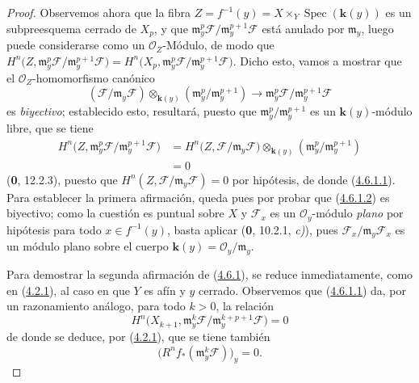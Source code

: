 \begin{proof}
Observemos ahora que la fibra
$Z=f^{-1}(y)=X\times_Y\operatorname{Spec}(\boldsymbol{k}(y))$ es un subpreesquema cerrado
de $X_p$, y que
$\mathfrak m_y^p\mathcal F/\mathfrak m_y^{p+1}\mathcal F$ está anulado por
$\mathfrak m_y$, luego puede considerarse como un $\mathcal O_Z$-Módulo, de
modo que
$H^n\bigl(Z,\mathfrak m_y^p\mathcal F/
\mathfrak m_y^{p+1}\mathcal F\bigr)
=H^n\bigl(X_p,\mathfrak m_y^p\mathcal F/
\mathfrak m_y^{p+1}\mathcal F\bigr)$.
Dicho esto, vamos a mostrar que el $\mathcal O_Z$-homomorfismo canónico
\[
\label{III.4.6.1.2-fr}
(\mathcal F/\mathfrak m_y\mathcal F)
\otimes_{\mathbf{k}(y)}(\mathfrak m_y^p/\mathfrak m_y^{p+1})
\longrightarrow
\mathfrak m_y^p\mathcal F/\mathfrak m_y^{p+1}\mathcal F
\tag{4.6.1.2}
\]
es \emph{biyectivo}; establecido esto, resultará, puesto que
$\mathfrak m_y^p/\mathfrak m_y^{p+1}$ es un $\boldsymbol{k}(y)$-módulo libre, que se tiene
\[
\begin{split}
H^n\bigl(Z,\mathfrak m_y^p\mathcal F/
\mathfrak m_y^{p+1}\mathcal F\bigr)
&=H^n\bigl(Z,\mathcal F/\mathfrak m_y\mathcal F\bigr)
\otimes_{\mathbf{k}(y)}(\mathfrak m_y^p/\mathfrak m_y^{p+1})\\
&=0
\end{split}
\]
(\textbf{0}, 12.2.3), puesto que
$H^n(Z,\mathcal F/\mathfrak m_y\mathcal F)=0$ por hipótesis, de donde
(\hyperref[III.4.6.1.1-fr]{4.6.1.1}). Para establecer la primera afirmación,
queda pues por probar que (\hyperref[III.4.6.1.2-fr]{4.6.1.2}) es biyectivo;
como la cuestión es puntual sobre $X$ y $\mathcal F_x$ es un
$\mathcal O_y$-módulo \emph{plano} por hipótesis para todo $x\in f^{-1}(y)$,
basta aplicar (\textbf{0}, 10.2.1, \emph{c)}), pues
$\mathcal F_x/\mathfrak m_y\mathcal F_x$ es un módulo plano sobre el cuerpo
$\boldsymbol{k}(y)=\mathcal O_y/\mathfrak m_y$.

Para demostrar la segunda afirmación de (\hyperref[III.4.6.1-fr]{4.6.1}), se
reduce inmediatamente, como en (\hyperref[III.4.2.1-fr]{4.2.1}), al caso en que
$Y$ es afín y $y$ cerrado. Observemos que
(\hyperref[III.4.6.1.1-fr]{4.6.1.1}) da, por un razonamiento análogo,
para todo $k>0$, la relación
\[
\label{III.4.6.1.3-fr}
H^n\bigl(X_{k+1},
\mathfrak m_y^k\mathcal F/
\mathfrak m_y^{k+p+1}\mathcal F\bigr)=0
\tag{4.6.1.3}
\]
de donde se deduce, por (\hyperref[III.4.2.1-fr]{4.2.1}), que se tiene también
\[
\label{III.4.6.1.4-fr}
\bigl(R^nf_*(\mathfrak m_y^k\mathcal F)\bigr)_y=0.
\tag{4.6.1.4}
\]


\end{proof}
